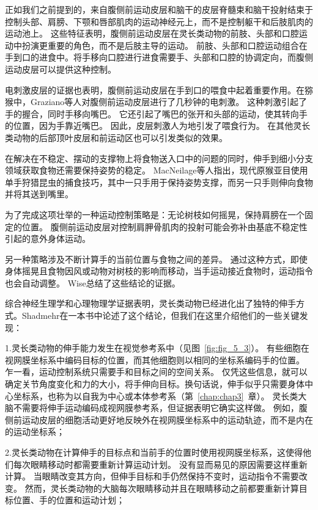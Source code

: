 正如我们之前提到的，来自腹侧前运动皮层和脑干的皮层脊髓束和脑干投射结束于控制头部、肩膀、下颚和唇部肌肉的运动神经元上，而不是控制躯干和后肢肌肉的运动池上。
这些特征表明，腹侧前运动皮层在灵长类动物的前肢、头部和口腔运动中扮演更重要的角色，而不是后肢主导的运动。
前肢、头部和口腔运动组合在手到口的进食中。将手移向口腔进行进食需要手、头部和口腔的协调定向，而腹侧运动皮层可以提供这种控制\cite{preuss1993role}。


电刺激皮层的证据也表明，腹侧前运动皮层在手到口的喂食中起着重要作用。在猕猴中，Graziano等人\cite{graziano2002cortical}对腹侧前运动皮层进行了几秒钟的电刺激。
这种刺激引起了手的握合，同时手移向嘴巴。
它还引起了嘴巴的张开和头部的运动，使其转向手的位置，因为手靠近嘴巴。
因此，皮层刺激人为地引发了喂食行为。
在其他灵长类动物的后部顶叶皮层和前运动区也可以引发类似的效果\cite{stepniewska2009organization,gharbawie2010thalamocortical}。


在解决在不稳定、摆动的支撑物上将食物送入口中的问题的同时，伸手到细小分支领域获取食物还需要保持姿势的稳定。
MacNeilage等人\cite{macneilage1987primate}指出，现代原猴亚目使用单手狩猎昆虫的捕食技巧，其中一只手用于保持姿势支撑，而另一只手则伸向食物并将其送到嘴里。


为了完成这项壮举的一种运动控制策略是：无论树枝如何摇晃，保持肩膀在一个固定的位置。
腹侧前运动皮层对控制肩胛骨肌肉的投射可能会弥补由基底不稳定性引起的意外身体运动。


另一种策略涉及不断计算手的当前位置与食物之间的差异。
通过这种方式，即使身体摇晃且食物因风或动物对树枝的影响而移动，当手运动接近食物时，运动指令也会自动调整。
Wise\cite{wise2007evolution}总结了这些结论的证据。


综合神经生理学和心理物理学证据表明，灵长类动物已经进化出了独特的伸手方式。Shadmehr\cite{shadmehr2004computational}在一本书中论述了这个结论，但我们在这里介绍他们的一些关键发现：\par

1.灵长类动物的伸手能力发生在视觉参考系中（见图~\ref{fig:fig_5_3}）。
有些细胞在视网膜坐标系中编码目标的位置，而其他细胞则以相同的坐标系编码手的位置。
乍一看，运动控制系统只需要手和目标之间的空间关系。
仅凭这些信息，就可以确定关节角度变化和力的大小，将手伸向目标。换句话说，伸手似乎只需要身体中心坐标系，也称为以自我为中心或本体参考系（第~\ref{chap:chap3}~章）。
灵长类大脑不需要将伸手运动编码成视网膜参考系，但证据表明它确实这样做。
例如，腹侧前运动皮层的细胞活动更好地反映外在视网膜坐标系中的运动轨迹，而不是内在的运动坐标系；\par


2.灵长类动物在计算伸手的目标点和当前手的位置时使用视网膜坐标系，这使得他们每次眼睛移动时都需要重新计算运动计划。
没有显而易见的原因需要这样重新计算。
当眼睛改变其方向，但伸手目标和手仍然保持不变时，运动指令不需要改变。
然而，灵长类动物的大脑每次眼睛移动并且在眼睛移动之前都要重新计算目标位置、手的位置和运动计划；\par


